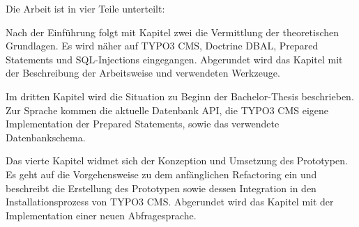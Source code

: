 Die Arbeit ist in vier Teile unterteilt:

Nach der Einführung folgt mit Kapitel zwei die Vermittlung der theoretischen Grundlagen. Es wird näher auf TYPO3 CMS, Doctrine DBAL, Prepared Statements und SQL-Injections eingegangen. Abgerundet wird das Kapitel mit der Beschreibung der Arbeitsweise und verwendeten Werkzeuge.

Im dritten Kapitel wird die Situation zu Beginn der Bachelor-Thesis beschrieben. Zur Sprache kommen die aktuelle Datenbank API, die TYPO3 CMS eigene Implementation der Prepared Statements, sowie das verwendete Datenbankschema.

Das vierte Kapitel widmet sich der Konzeption und Umsetzung des Prototypen. Es geht auf die Vorgehensweise zu dem anfänglichen Refactoring ein und beschreibt die Erstellung des Prototypen sowie dessen Integration in den Installationsprozess von TYPO3 CMS. Abgerundet wird das Kapitel mit der Implementation einer neuen Abfragesprache.




